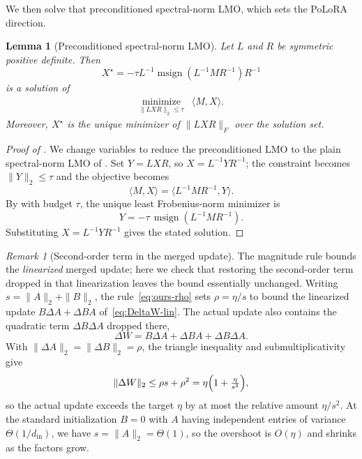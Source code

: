 \documentclass[11pt]{article}
\newcommand{\ip}[1]{\langle #1 \rangle}
\DeclareMathOperator{\msign}{msign}
\newcommand{\norm}[1]{\| #1\|}
\newcommand{\methodname}{PoLoRA\xspace}
\theoremstyle{plain}
\newtheorem{lemma}{Lemma}
\theoremstyle{definition}
\theoremstyle{remark}
\newtheorem{remark}{Remark}
\theoremstyle{definition}
\begin{document}
We then solve that preconditioned spectral-norm LMO, which sets the \methodname{} direction.
\begin{lemma}[Preconditioned spectral-norm LMO]
\label{lem:whitened-spectral-lmo}
Let $L$ and $R$ be symmetric positive definite. Then
\begin{equation}\label{e-gen-spectral-lmo-update}
X^\star = -\tau L^{-1}
\msign\left(L^{-1}MR^{-1}\right) R^{-1}
\end{equation}
is a solution of
\[
\begin{array}{ll}
\underset{\|LXR\|_2\leq\tau}{\mathrm{minimize}}&
\ip{M,X}.
\end{array}
\]
Moreover, $X^\star$ is the unique minimizer of
$\|LXR\|_F$ over the solution set.
\end{lemma}
\begin{proof}[Proof of ]
We change variables to reduce the preconditioned LMO to the plain spectral-norm
LMO of . Set $Y=LXR$, so $X=L^{-1}YR^{-1}$; the constraint
becomes $\norm{Y}_2\le\tau$ and the objective becomes
\[
\ip{M,X}=\ip{L^{-1}MR^{-1},Y} .
\]
By  with budget $\tau$, the unique least Frobenius-norm
minimizer is
\[
    Y=-\tau\,\msign(L^{-1}MR^{-1}).
\]
Substituting $X=L^{-1}YR^{-1}$ gives the stated solution.
\end{proof}

\begin{remark}[Second-order term in the merged update]
\label{rem:quadratic}
The magnitude rule bounds the \emph{linearized} merged update; here we check that
restoring the second-order term dropped in that linearization leaves the bound
essentially unchanged. Writing $s=\norm{A}_2+\norm{B}_2$, the
rule~\eqref{eq:ours-rho} sets $\rho=\eta/s$ to bound the linearized update
$B\Delta A+\Delta B A$ of~\eqref{eq:DeltaW-lin}. The actual update also contains
the quadratic term $\Delta B\Delta A$ dropped there,
\[
  \Delta W = B\Delta A+\Delta B A+\Delta B\Delta A .
\]
With $\norm{\Delta A}_2=\norm{\Delta B}_2=\rho$, the triangle inequality and
submultiplicativity give
\[
  \norm{\Delta W}_2\le\rho s+\rho^2=\eta\Bigl(1+\tfrac{\eta}{s^2}\Bigr),
\]
so the actual update exceeds the target $\eta$ by at most the relative amount
$\eta/s^2$. At the standard initialization $B=0$ with $A$ having independent
entries of variance $\Theta(1/d_{\mathrm{in}})$, we have $s=\norm{A}_2=\Theta(1)$,
so the overshoot is $O(\eta)$ and shrinks as the factors grow.
\end{remark}
\end{document}
